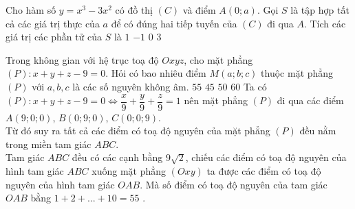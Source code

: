 \begin{ex}%
	Cho hàm số $y=x^3-3x^2$ có đồ thị $(C)$ và điểm $A(0;a)$. Gọi $S$ là tập hợp tất cả các giá trị thực của $a$ để có đúng hai tiếp tuyến của $(C)$ đi qua $A$. Tích các giá trị các phần tử của $S$ là
	\choice
	{$1$}
	{$-1$}
	{\True $0$}
	{$3$}
\end{ex}

\begin{ex}%
	Trong không gian với hệ trục toạ độ $Oxyz$, cho mặt phẳng $(P)\colon x+y+z-9=0$. Hỏi có bao nhiêu điểm $M(a;b;c)$ thuộc mặt phẳng $(P)$ với $ a,b,c $ là các số nguyên không âm.
	\choice
	{\True $55$}
	{$45$}
	{$50$}
	{$60$}
	\loigiai
	{Ta có $(P)\colon x+y+z-9=0\Leftrightarrow \dfrac{x}{9}+\dfrac{y}{9}+\dfrac{z}{9}=1$ nên mặt phẳng $(P)$ đi qua các điểm $A(9;0;0)$, $B(0; 9; 0)$, $C(0; 0; 9)$.\\
		Từ đó suy ra tất cả các điểm có toạ độ nguyên của mặt phẳng $(P)$ đều nằm trong miền tam giác $ABC$.\\
		Tam giác $ABC$ đều có các cạnh bằng $9\sqrt{2}$, chiếu các điểm có toạ độ nguyên của hình tam giác $ABC$ xuống mặt phẳng $(Oxy)$ ta được các điểm có toạ độ nguyên của hình tam giác $OAB$. Mà số điểm có toạ độ nguyên của tam giác $OAB$ bằng $1+2+...+10=55$ .}
\end{ex}

